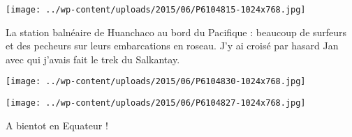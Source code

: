  \newline
 \newline
\centerline{\texttt{[image: ../wp-content/uploads/2015/06/P6104815-1024x768.jpg]} } 
 \newline
 La station balnéaire de Huanchaco au bord du Pacifique : beaucoup de surfeurs et des pecheurs sur leurs embarcations en roseau. J'y ai croisé par hasard Jan avec qui j'avais fait le trek du Salkantay. \newline
 \newline
\centerline{\texttt{[image: ../wp-content/uploads/2015/06/P6104830-1024x768.jpg]} } 
 \newline
 \newline
\centerline{\texttt{[image: ../wp-content/uploads/2015/06/P6104827-1024x768.jpg]} } 
 \newline
 A bientot en Equateur ! \newline

\newpage
 
